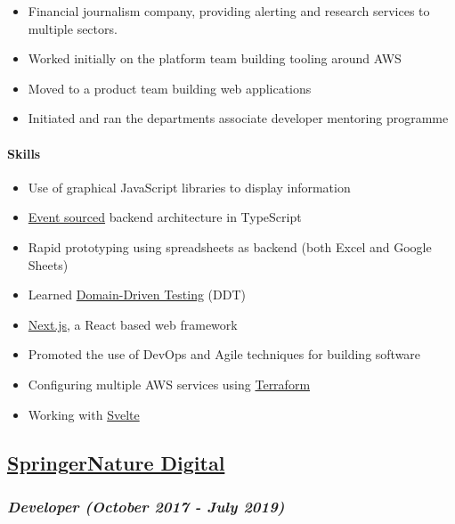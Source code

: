 \begin{itemize}
\tightlist
\item
  Financial journalism company, providing alerting and research services
  to multiple sectors.
\item
  Worked initially on the platform team building tooling around AWS
\item
  Moved to a product team building web applications
\item
  Initiated and ran the departments associate developer mentoring
  programme
\end{itemize}

\hypertarget{skills-0}{%
\paragraph{Skills}\label{skills-0}}

\begin{itemize}
\tightlist
\item
  Use of graphical JavaScript libraries to display information
\item
  \href{https://martinfowler.com/eaaDev/EventSourcing.html}{Event
  sourced} backend architecture in TypeScript
\item
  Rapid prototyping using spreadsheets as backend (both Excel and Google
  Sheets)
\item
  Learned \href{http://natpryce.com/articles/000819.html}{Domain-Driven
  Testing} (DDT)
\item
  \href{https://nextjs.org/}{Next.js}, a React based web framework
\item
  Promoted the use of DevOps and Agile techniques for building software
\item
  Configuring multiple AWS services using
  \href{https://www.terraform.io/}{Terraform}
\item
  Working with \href{https://svelte.dev/}{Svelte}
\end{itemize}

\hypertarget{springernature-digital}{%
\subsection{\texorpdfstring{\href{http://www.springernature.com}{SpringerNature
Digital}}{SpringerNature Digital}}\label{springernature-digital}}

\hypertarget{developer-october-2017---june-2019}{%
\subsubsection{\texorpdfstring{\emph{Developer (October 2017 - July
2019)}}{Developer (October 2017 - July 2019)}}\label{developer-october-2017---june-2019}}

